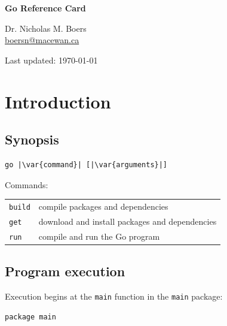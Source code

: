 \documentclass{article}
\newcommand{\var}[1]{\texttt{\textit{\underbar{#1}}}}
\begin{document}
\raggedright

\begin{multicols*}{3}
  \footnotesize

  \begin{center}
    {\Large{}\bfseries{}Go Reference Card}

    Dr. Nicholas M. Boers\\
    \url{boersn@macewan.ca}\\

    Last updated: \today
  \end{center}

  \filbreak
  \section*{Introduction}

  \subsection*{Synopsis}

\begin{lstlisting}[language=plain,escapechar=|]
go |\var{command}| [|\var{arguments}|]
\end{lstlisting}

  Commands:

  \begin{tabular}{p{0.5in}p{2.5in}}
    \texttt{build} & compile packages and dependencies \\
    \texttt{get} & download and install packages and dependencies \\
    \texttt{run} & compile and run the Go program \\
  \end{tabular}

  \subsection*{Program execution}

  Execution begins at the \lstinline{main} function in the \lstinline{main} package:
\begin{lstlisting}[frame=single,escapechar=\%]
package main


\end{lstlisting}
\end{multicols*}
\end{document}
